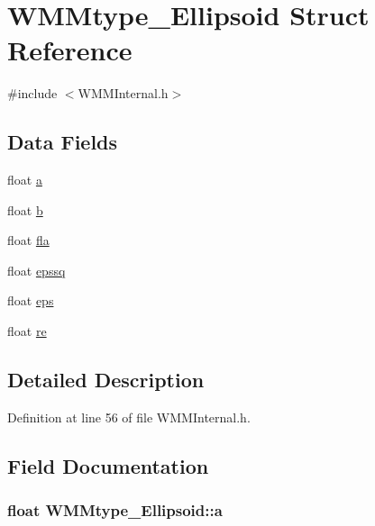 \hypertarget{struct_w_m_mtype___ellipsoid}{\section{\-W\-M\-Mtype\-\_\-\-Ellipsoid \-Struct \-Reference}
\label{struct_w_m_mtype___ellipsoid}
}


{\ttfamily \#include $<$\-W\-M\-M\-Internal.\-h$>$}

\subsection*{\-Data \-Fields}
\begin{DoxyCompactItemize}
\item 
float \hyperlink{struct_w_m_mtype___ellipsoid_a9bcd028638f788a140352852646f5bf8}{a}
\item 
float \hyperlink{struct_w_m_mtype___ellipsoid_a6fa136040ff9c95d8681b3ed1522961a}{b}
\item 
float \hyperlink{struct_w_m_mtype___ellipsoid_a4bfc3186db2254aa1de93bfd694b420b}{fla}
\item 
float \hyperlink{struct_w_m_mtype___ellipsoid_a15d66d7d6873c33670330e639d548626}{epssq}
\item 
float \hyperlink{struct_w_m_mtype___ellipsoid_ab0125e1a063bfd086922e84040946912}{eps}
\item 
float \hyperlink{struct_w_m_mtype___ellipsoid_aca51be6e99eef3c6a7a7f16c292e60c5}{re}
\end{DoxyCompactItemize}


\subsection{\-Detailed \-Description}


\-Definition at line 56 of file \-W\-M\-M\-Internal.\-h.



\subsection{\-Field \-Documentation}
\hypertarget{struct_w_m_mtype___ellipsoid_a9bcd028638f788a140352852646f5bf8}{
\subsubsection[{a}]{\setlength{\rightskip}{0pt plus 5cm}float {\bf \-W\-M\-Mtype\-\_\-\-Ellipsoid\-::a}}}\label{struct_w_m_mtype___ellipsoid_a9bcd028638f788a140352852646f5bf8}


